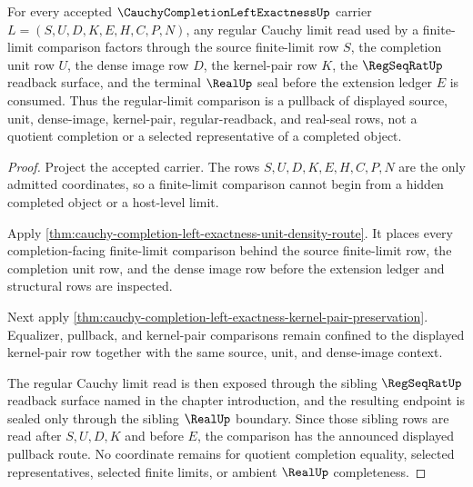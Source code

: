 \begin{theorem}
\label{thm:cauchy-completion-left-exactness-regular-limit-pullback}
For every accepted $\CauchyCompletionLeftExactnessUp$ carrier $L=(S,U,D,K,E,H,C,P,N)$, any regular Cauchy limit read used by a finite-limit comparison factors through the source finite-limit row $S$, the completion unit row $U$, the dense image row $D$, the kernel-pair row $K$, the $\RegSeqRatUp$ readback surface, and the terminal $\RealUp$ seal before the extension ledger $E$ is consumed. Thus the regular-limit comparison is a pullback of displayed source, unit, dense-image, kernel-pair, regular-readback, and real-seal rows, not a quotient completion or a selected representative of a completed object.
\end{theorem}
\begin{proof}
Project the accepted carrier. The rows $S,U,D,K,E,H,C,P,N$ are the only admitted coordinates, so a finite-limit comparison cannot begin from a hidden completed object or a host-level limit.

Apply \autoref{thm:cauchy-completion-left-exactness-unit-density-route}. It places every completion-facing finite-limit comparison behind the source finite-limit row, the completion unit row, and the dense image row before the extension ledger and structural rows are inspected.

Next apply \autoref{thm:cauchy-completion-left-exactness-kernel-pair-preservation}. Equalizer, pullback, and kernel-pair comparisons remain confined to the displayed kernel-pair row together with the same source, unit, and dense-image context.

The regular Cauchy limit read is then exposed through the sibling $\RegSeqRatUp$ readback surface named in the chapter introduction, and the resulting endpoint is sealed only through the sibling $\RealUp$ boundary. Since those sibling rows are read after $S,U,D,K$ and before $E$, the comparison has the announced displayed pullback route. No coordinate remains for quotient completion equality, selected representatives, selected finite limits, or ambient $\RealUp$ completeness.
\end{proof}

